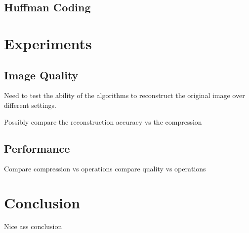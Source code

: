 \documentclass[review,onefignum,onetabnum]{siamart190516}
\begin{document}
\subsection{Huffman Coding}

\section{Experiments}
\subsection{Image Quality}
Need to test the ability of the algorithms to reconstruct the original image 
over different settings.

Possibly compare the reconstruction accuracy vs the compression

\lipsum[26-30]

\subsection{Performance}
Compare compression vs operations
compare quality vs operations

\lipsum[31-32]

\section{Conclusion}
Nice ass conclusion

\lipsum[33-34]

\pagebreak


\end{document}

